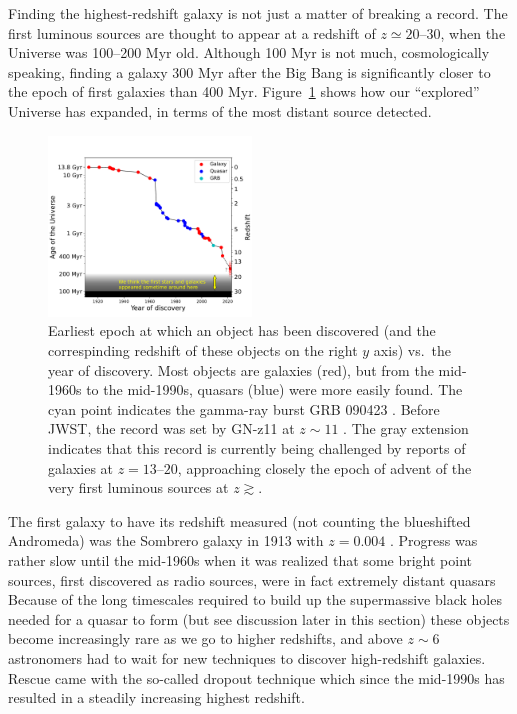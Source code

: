 \documentclass[useAMS]{aa}
\begin{document}
Finding the highest-redshift galaxy is not just a matter of breaking a record. The first luminous sources are thought to appear at a redshift of $z\simeq20\text{--}30$, when the Universe was 100--200 Myr old.
Although 100 Myr is not much, cosmologically speaking, finding a galaxy 300 Myr after the Big Bang is significantly closer to the epoch of first galaxies than 400 Myr.
Figure~\ref{fig:zrecord} shows how our ``explored'' Universe has expanded, in terms of the most distant source detected.
\begin{figure}[!t]
    \centering
    \includegraphics [width=0.48\textwidth] {zrecord.pdf}
    \caption{Earliest epoch at which an object has been discovered (and the correspinding redshift of these objects on the right $y$ axis) vs.~the year of discovery.
    Most objects are galaxies (red), but from the mid-1960s to the mid-1990s, quasars (blue) were more easily found. The cyan point indicates the gamma-ray burst GRB 090423 \citep{Tanvir2009}.
    Before JWST, the record was set by GN-z11 at $z\sim11$ \citep{Oesch2016}. %
    The gray extension indicates that this record is currently being challenged by reports of galaxies at $z=13\text{--}20$, approaching closely the epoch of advent of the very first luminous sources at $z\gtrsim$.}
    \label{fig:zrecord}
\end{figure}
The first galaxy to have its redshift measured (not counting the blueshifted Andromeda) was the Sombrero galaxy in 1913 with $z=0.004$ \citep{Slipher1915,Hoyt1980}. Progress was rather slow until the mid-1960s when it was realized that some bright point sources, first discovered as radio sources, were in fact extremely distant quasars \citep{Schmidt1964,Schmidt1965}
Because of the long timescales required to build up the supermassive black holes needed for a quasar to form
(but see discussion later in this section)
these objects become increasingly rare as we go to higher redshifts, and above $z\sim6$ astronomers had to wait for new techniques to discover high-redshift galaxies.
Rescue came with the so-called dropout technique \citep{Steidel1996} which since the mid-1990s has resulted in a steadily increasing highest redshift.
\end{document}
